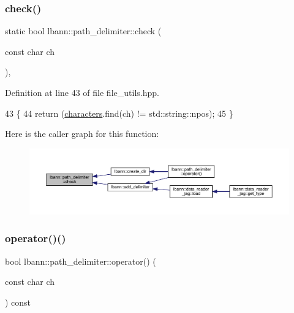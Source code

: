 \subsubsection{\texorpdfstring{check()}{check()}}
{\footnotesize\ttfamily static bool lbann\+::path\+\_\+delimiter\+::check (\begin{DoxyParamCaption}\item[{const char}]{ch }\end{DoxyParamCaption})\hspace{0.3cm}{\ttfamily [inline]}, {\ttfamily [static]}}



Definition at line 43 of file file\+\_\+utils.\+hpp.


\begin{DoxyCode}
43                                    \{
44     \textcolor{keywordflow}{return} (\hyperlink{structlbann_1_1path__delimiter_ac64e71aff928b202c0c9e880ea641315}{characters}.find(ch) != std::string::npos);
45   \}
\end{DoxyCode}
Here is the caller graph for this function\+:\nopagebreak
\begin{figure}[H]
\begin{center}
\leavevmode
\includegraphics[width=350pt]{structlbann_1_1path__delimiter_adb3d520b3e7b9f9aa8327245ea943bdf_icgraph}
\end{center}
\end{figure}
\mbox{\label{structlbann_1_1path__delimiter_a89e287e7a7c4b4fc2863da116f199a71}} 
\subsubsection{\texorpdfstring{operator()()}{operator()()}}
{\footnotesize\ttfamily bool lbann\+::path\+\_\+delimiter\+::operator() (\begin{DoxyParamCaption}\item[{const char}]{ch }\end{DoxyParamCaption}) const\hspace{0.3cm}{\ttfamily [inline]}}



